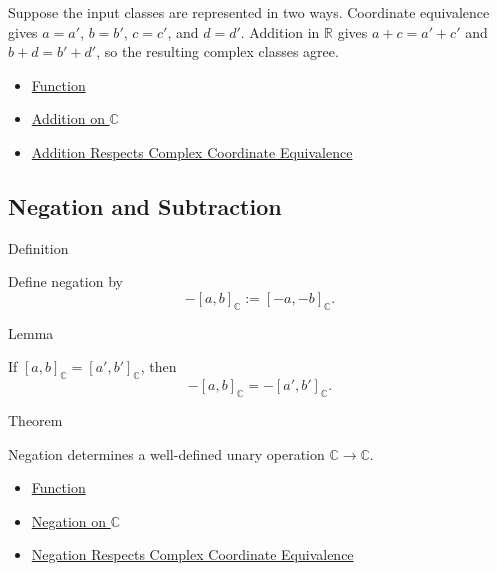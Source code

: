 \begin{remark*}
Suppose the input classes are represented in two ways. Coordinate equivalence
gives \(a=a'\), \(b=b'\), \(c=c'\), and \(d=d'\). Addition in
\(\mathbb{R}\) gives \(a+c=a'+c'\) and \(b+d=b'+d'\), so the resulting
complex classes agree.
\end{remark*}

\begin{dependencies}
\begin{itemize}
  \item \hyperref[def:function]{Function}
  \item \hyperref[def:addition-on-c-classes]{Addition on $\mathbb{C}$}
  \item \hyperref[lem:addition-on-c-respects-equivalence]{Addition Respects Complex Coordinate Equivalence}
\end{itemize}
\end{dependencies}

\subsection*{Negation and Subtraction}

\begin{definitionbox}{Definition}
\begin{definition}
\label{def:negation-on-c-classes}
Define negation by
\[
-[a,b]_{\mathbb{C}}:=[-a,-b]_{\mathbb{C}}.
\]
\end{definition}
\end{definitionbox}

\begin{lemmabox}{Lemma}
\begin{lemma}
\label{lem:negation-on-c-respects-equivalence}
If $[a,b]_{\mathbb{C}}=[a',b']_{\mathbb{C}}$, then
\[
-[a,b]_{\mathbb{C}}=-[a',b']_{\mathbb{C}}.
\]
\end{lemma}
\end{lemmabox}

\begin{theorembox}{Theorem}
\begin{theorem}
\label{thm:negation-on-c-well-defined}
Negation determines a well-defined unary operation $\mathbb{C}\to\mathbb{C}$.
\end{theorem}
\end{theorembox}

\begin{dependencies}
\begin{itemize}
  \item \hyperref[def:function]{Function}
  \item \hyperref[def:negation-on-c-classes]{Negation on $\mathbb{C}$}
  \item \hyperref[lem:negation-on-c-respects-equivalence]{Negation Respects Complex Coordinate Equivalence}
\end{itemize}
\end{dependencies}

